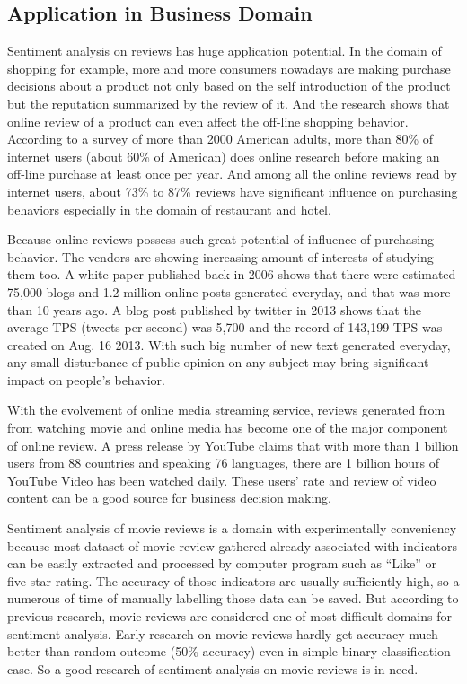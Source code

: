 \documentclass[conference]{IEEEtran}
\begin{document}
\subsection{Application in Business Domain}
    Sentiment analysis on reviews has huge application potential. In the domain of
    shopping for example, more and more consumers nowadays are making
    purchase decisions about a product not only based on the self introduction of the
    product but the reputation summarized by the review of it. And the research
    shows that online review of a product can even affect the off-line shopping
    behavior\cite{lipsman2007online}. According to a survey of more than 2000
    American adults, more than 80\% of internet users (about 60\% of American)
    does online research before making an off-line purchase at least once per year.
    And among all the online reviews read by internet users, about 73\% to 87\% reviews
    have significant influence on purchasing behaviors especially in the domain
    of restaurant and hotel\cite{pang2008opinion}.

    Because online reviews possess such great potential of influence of purchasing
    behavior. The vendors are showing increasing amount of interests of studying them
    too. A white paper published back in 2006\cite{kim2006forrester} shows that
    there were estimated 75,000 blogs and 1.2 million online posts generated
    everyday, and that was more than 10 years ago. A blog post published by twitter
    in 2013 shows that the average TPS (tweets per second) was 5,700 and the record
    of 143,199 TPS was created on Aug. 16 2013\cite{tps2013}. With such big number of
    new text generated everyday, any small disturbance of public opinion on any subject
    may bring significant impact on people's behavior.

    With the evolvement of online media streaming service, reviews generated from
    from watching movie and online media has become one of the major component of
    online review. A press release by YouTube claims that with more than 1 billion
    users from 88 countries and speaking 76 languages, there are 1 billion
    hours of YouTube Video has been watched daily. These users' rate and review of
    video content can be a good source for business decision making.

    Sentiment analysis of movie reviews is a domain with experimentally conveniency
    because most dataset of movie review gathered already associated with indicators
    can be easily extracted and processed by computer program such as
    ``Like'' or five-star-rating. The accuracy of those indicators are usually sufficiently
    high, so a numerous of time of manually labelling those data can be saved. But
    according to previous research\cite{turney2002unsupervised}, movie reviews are
    considered one of most difficult domains for sentiment analysis. Early research
    on movie reviews hardly get accuracy much better than random outcome
    (50\% accuracy) even in simple binary classification case\cite{pang2002thumbs}.
    So a good research of sentiment analysis on movie reviews is in need.
\end{document}
